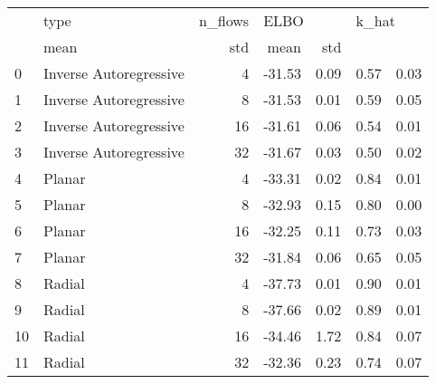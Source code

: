 \begin{tabular}{llrrrrr}
\toprule
{} &                    type & n\_flows & \multicolumn{2}{l}{ELBO} & \multicolumn{2}{l}{k\_hat} \\
{} &   mean &  std &  mean &  std \\
\midrule
0  &  Inverse Autoregressive &       4 & -31.53 & 0.09 &  0.57 & 0.03 \\
1  &  Inverse Autoregressive &       8 & -31.53 & 0.01 &  0.59 & 0.05 \\
2  &  Inverse Autoregressive &      16 & -31.61 & 0.06 &  0.54 & 0.01 \\
3  &  Inverse Autoregressive &      32 & -31.67 & 0.03 &  0.50 & 0.02 \\
4  &                  Planar &       4 & -33.31 & 0.02 &  0.84 & 0.01 \\
5  &                  Planar &       8 & -32.93 & 0.15 &  0.80 & 0.00 \\
6  &                  Planar &      16 & -32.25 & 0.11 &  0.73 & 0.03 \\
7  &                  Planar &      32 & -31.84 & 0.06 &  0.65 & 0.05 \\
8  &                  Radial &       4 & -37.73 & 0.01 &  0.90 & 0.01 \\
9  &                  Radial &       8 & -37.66 & 0.02 &  0.89 & 0.01 \\
10 &                  Radial &      16 & -34.46 & 1.72 &  0.84 & 0.07 \\
11 &                  Radial &      32 & -32.36 & 0.23 &  0.74 & 0.07 \\
\bottomrule
\end{tabular}
